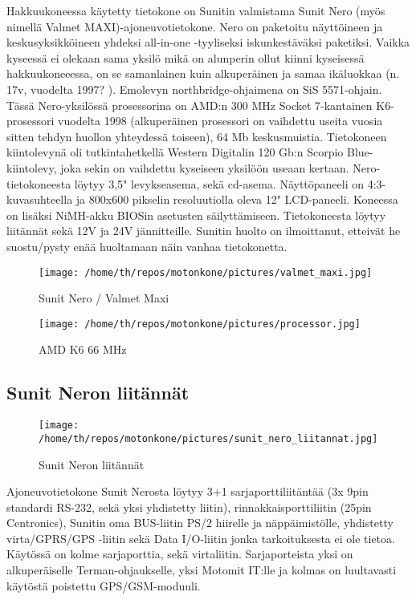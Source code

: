 \documentclass[11pt,a4paper,oneside,article]{memoir}
\begin{document}
Hakkuukoneessa käytetty tietokone on Sunitin valmistama Sunit Nero (myös nimellä Valmet MAXI)-ajoneuvotietokone. Nero on paketoitu näyttöineen ja keskusyksikköineen yhdeksi all-in-one -tyyliseksi iskunkestäväksi paketiksi. Vaikka kyseessä ei olekaan sama yksilö mikä on alunperin ollut kiinni kyseisessä hakkuukoneeessa, on se samanlainen kuin alkuperäinen ja samaa ikäluokkaa (n. 17v, vuodelta 1997? ). Emolevyn northbridge-ohjaimena on SiS 5571-ohjain. Tässä Nero-yksilössä prosessorina on AMD:n 300 MHz Socket 7-kantainen K6-prosessori vuodelta 1998 (alkuperäinen prosessori on vaihdettu useita vuosia sitten tehdyn huollon yhteydessä toiseen), 64 Mb keskusmuistia. Tietokoneen kiintolevynä oli tutkintahetkellä Western Digitalin 120 Gb:n Scorpio Blue-kiintolevy, joka sekin on vaihdettu kyseiseen yksilöön useaan kertaan. Nero-tietokoneesta löytyy 3,5" levykseasema, sekä cd-asema. Näyttöpaneeli on 4:3-kuvasuhteella ja 800x600 pikselin resoluutiolla oleva 12" LCD-paneeli. Koneessa on lisäksi NiMH-akku BIOSin asetusten säilyttämiseen. Tietokoneesta löytyy liitännät sekä 12V ja 24V jännitteille. Sunitin huolto on ilmoittanut, etteivät he suostu/pysty enää huoltamaan näin vanhaa tietokonetta.

\begin{figure}[H]
\centering
\texttt{[image: /home/th/repos/motonkone/pictures/valmet\_maxi.jpg]}
\caption{Sunit Nero / Valmet Maxi}
\end{figure}

\begin{figure}[H]
\centering
\texttt{[image: /home/th/repos/motonkone/pictures/processor.jpg]}
\caption{AMD K6 66 MHz}
\end{figure}

\subsection{Sunit Neron liitännät}
\begin{figure}[H]
\centering
\texttt{[image: /home/th/repos/motonkone/pictures/sunit\_nero\_liitannat.jpg]}
\caption{Sunit Neron liitännät}
\end{figure}

Ajoneuvotietokone Sunit Nerosta löytyy 3+1 sarjaporttiliitäntää (3x 9pin standardi RS-232, sekä yksi yhdistetty liitin), rinnakkaisporttiliitin (25pin Centronics), Sunitin oma BUS-liitin PS/2 hiirelle ja näppäimistölle, yhdistetty virta/GPRS/GPS -liitin sekä Data I/O-liitin jonka tarkoituksesta ei ole tietoa. Käytössä on kolme sarjaporttia, sekä virtaliitin. Sarjaporteista yksi on alkuperäiselle Terman-ohjaukselle, yksi Motomit IT:lle ja kolmas on luultavasti käytöstä poistettu GPS/GSM-moduuli.
\end{document}
